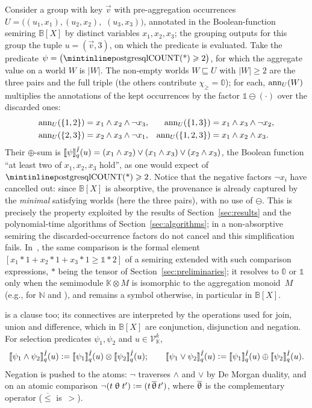 \begin{example}\label{ex:semantics}
Consider a group with key $\vec v$ with pre-aggregation occurrences
$U=\bigl((u_1,x_1),(u_2,x_2),$ $(u_3,x_3)\bigr)$, annotated in the
Boolean-function semiring $\mathbb B[X]$ by distinct variables
$x_1,x_2,x_3$; the grouping outputs for this group the tuple
$u=(\vec v,3)$, on which the predicate is evaluated. Take the predicate
$\psi=\bigl(\text{\sql{COUNT(*)}}\ge 2\bigr)$, for which the aggregate value on a
world $W$ is $|W|$. The non-empty
worlds $W\sqsubseteq U$ with $|W|\ge 2$ are the three pairs and the full
triple (the others contribute $\chi_{\ge}=\mathbb 0$); for each, $\ann_U(W)$
multiplies the annotations of the kept occurrences by the factor
$\mathbb 1\ominus(\cdot)$ over the discarded ones:
\begin{align*}
  \ann_U(\{1,2\})&=x_1\land x_2\land\lnot x_3, &
  \ann_U(\{1,3\})&=x_1\land x_3\land\lnot x_2,\\
  \ann_U(\{2,3\})&=x_2\land x_3\land\lnot x_1, &
  \ann_U(\{1,2,3\})&=x_1\land x_2\land x_3.
\end{align*}
Their $\oplus$-sum is
$\predsem{\hat I}{q}{\psi}(u)=
(x_1\land x_2)\lor(x_1\land x_3)\lor(x_2\land x_3)$,
the Boolean function ``at least two of $x_1,x_2,x_3$ hold'', as one would
expect of $\text{\sql{COUNT(*)}}\ge 2$. Notice that the negative factors
$\lnot x_i$ have cancelled out: since $\mathbb B[X]$ is absorptive, the
provenance is already captured by the \emph{minimal} satisfying worlds
(here the three pairs), with no use of $\ominus$. This is precisely the
property exploited by the results of Section~\ref{sec:results} and the
polynomial-time algorithms of Section~\ref{sec:algorithms}; in a
non-absorptive semiring the discarded-occurrence factors do not cancel
and this simplification fails. In~\cite{amsterdamer2011provenance}, the
same comparison is the formal element
$[x_1*1+x_2*1+x_3*1\geq\mathbb 1*2]$ of a semiring extended with such
comparison expressions, $*$ being the tensor of
Section~\ref{sec:preliminaries}; it resolves to $\mathbb 0$ or
$\mathbb 1$ only when the semimodule $\mathbb K\otimes M$ is isomorphic to
the aggregation monoid~$M$ (e.g., for $\mathbb N$ and ), and
remains a symbol otherwise, in particular in $\mathbb B[X]$.
\end{example}

 is a  clause too; its
connectives are interpreted by the operations used for join, union and
difference, which in $\mathbb B[X]$ are conjunction, disjunction and
negation. For selection predicates
$\psi_1,\psi_2$ and $u\in\mathcal V_{\mathbb K}^k$,
\[
\predsem{\hat I}{q}{\psi_1\land\psi_2}(u)\defeq
  \predsem{\hat I}{q}{\psi_1}(u)\otimes\predsem{\hat I}{q}{\psi_2}(u);
\qquad
\predsem{\hat I}{q}{\psi_1\lor\psi_2}(u)\defeq
  \predsem{\hat I}{q}{\psi_1}(u)\oplus\predsem{\hat I}{q}{\psi_2}(u).
\]
Negation is pushed to the atoms: $\neg$ traverses $\land$ and $\lor$ by
De Morgan duality, and on an atomic comparison
$\neg(t\op t')\defeq(t\,\overline{\op}\,t')$, where $\overline{\op}$
is the complementary operator ($\overline{\le}$ is~$>$).

